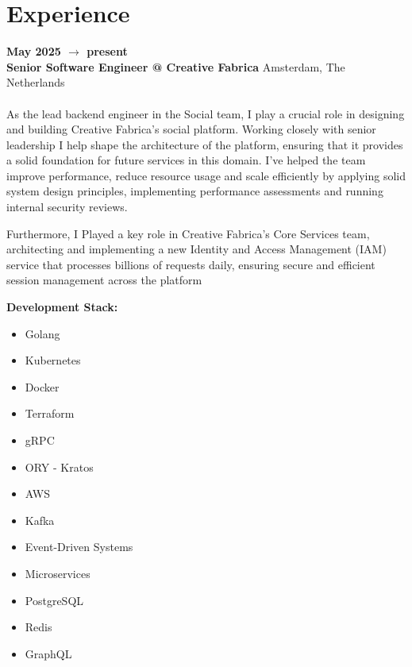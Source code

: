 \documentclass[10pt]{friggeri-cv} %
\renewcommand{\entry}[4]{%
  \textbf{#1} \\
\textbf{#2}%
    \hfill%
    {\footnotesize\addfontfeature{Color=lightgray} #3}\\%
    #4\vspace{0.3\parsep}%
}
\begin{document}
\section{Experience}
\entry
{May 2025 $\rightarrow$  present}
{\normalfont Senior Software Engineer @ \textbf{Creative Fabrica}}
{Amsterdam, The Netherlands}
{\textbf{} \\
As the lead backend engineer in the Social team, I play a crucial role in designing and building  Creative Fabrica's social platform. Working closely with senior leadership I help shape the architecture of the platform, ensuring that it provides a solid foundation for future services in this domain. 
I've helped the team improve performance, reduce resource usage and scale efficiently by applying solid system design principles, implementing performance assessments and running internal security reviews.

Furthermore, I Played a key role in Creative Fabrica's Core Services team, architecting and implementing a new Identity and Access Management (IAM) service that processes billions of requests daily, ensuring secure and efficient session management across the platform

\textbf{Development Stack:}\\
\begin{minipage}[t]{0.5\textwidth}
  \begin{itemize}
      \item Golang
      \item Kubernetes
      \item Docker
      \item Terraform
      \item gRPC
      \item ORY - Kratos
  \end{itemize}
\end{minipage}%
%
\begin{minipage}[t]{0.5\textwidth}
  \begin{itemize}
      \item AWS
      \item Kafka
      \item Event-Driven Systems
      \item Microservices
      \item PostgreSQL
      \item Redis
      \item GraphQL
  \end{itemize}
\end{minipage}%
}
\\\\\
\end{document}
